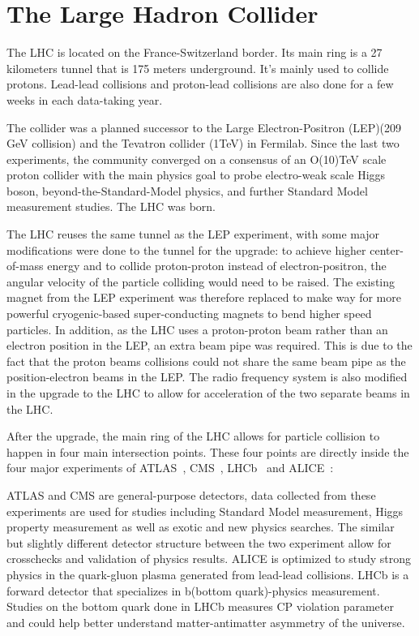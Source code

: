 \section{The Large Hadron Collider}
\label{LHC}

The LHC is located on the France-Switzerland border. Its main ring is a 27 kilometers tunnel that is 175 meters underground. It's mainly used to collide protons. Lead-lead collisions and proton-lead collisions are also done for a few weeks in each data-taking year. 

The collider was a planned successor to the Large Electron-Positron (LEP)(209 GeV collision) and the Tevatron collider (1TeV) in Fermilab. Since the last two experiments, the community converged on a consensus of an O(10)TeV scale proton collider with the main physics goal to probe electro-weak scale Higgs boson, beyond-the-Standard-Model physics, and further Standard Model measurement studies. The LHC was born.

The LHC reuses the same tunnel as the LEP experiment, with some major modifications were done to the tunnel for the upgrade: to achieve higher center-of-mass energy and to collide proton-proton instead of electron-positron, the angular velocity of the particle colliding would need to be raised. The existing magnet from the LEP experiment was therefore replaced to make way for more powerful cryogenic-based super-conducting magnets to bend higher speed particles. In addition, as the LHC uses a proton-proton beam rather than an electron position in the LEP, an extra beam pipe was required. This is due to the fact that the proton beams collisions could not share the same beam pipe as the position-electron beams in the LEP. The radio frequency system is also modified in the upgrade to the LHC to allow for acceleration of the two separate beams in the LHC.

After the upgrade, the main ring of the LHC allows for particle collision to happen in four main intersection points. These four points are directly inside the four major experiments of ATLAS~\cite{ATLAS:1999vwa}, CMS~\cite{CMS:2006myw}, LHCb~\cite{lhcb2001technical} and ALICE~\cite{Cortese:519145}: 

ATLAS and CMS are general-purpose detectors, data collected from these experiments are used for studies including Standard Model measurement, Higgs property measurement as well as exotic and new physics searches. The similar but slightly different detector structure between the two experiment allow for crosschecks and validation of physics results. ALICE is optimized to study strong physics in the quark-gluon plasma generated from lead-lead collisions. LHCb is a forward detector that specializes in b(bottom quark)-physics measurement. Studies on the bottom quark done in LHCb measures CP violation parameter and could help better understand matter-antimatter asymmetry of the universe. 

